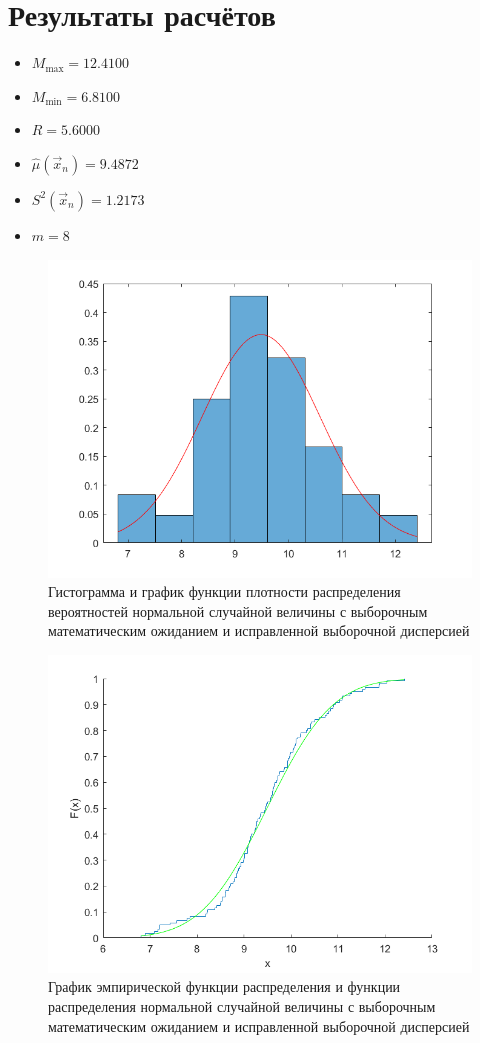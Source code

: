 \documentclass[12pt]{report}
\begin{document}
\section*{Результаты расчётов}

\begin{itemize}
	\item $M_{\max} = 12.4100$
	\item $M_{\min} = 6.8100$
	\item $R = 5.6000$
	\item $\hat\mu(\vec x_n) = 9.4872$
	\item $S^2(\vec x_n) = 1.2173$
	\item $m = 8$
\end{itemize}

\begin{figure}[H]
	\centering
	\includegraphics[scale=0.7]{imgs/hist_dens.png}
	\caption{Гистограмма и график функции плотности распределения вероятностей нормальной случайной величины с выборочным математическим ожиданием и исправленной выборочной  дисперсией}
	\label{fig:1}
\end{figure}

\begin{figure}[H]
	\centering
	\includegraphics[scale=0.7]{imgs/func.png}
	\caption{График эмпирической функции распределения и функции распределения нормальной случайной величины с выборочным математическим ожиданием и исправленной выборочной  дисперсией}
	\label{fig:2}
\end{figure}
\end{document}
